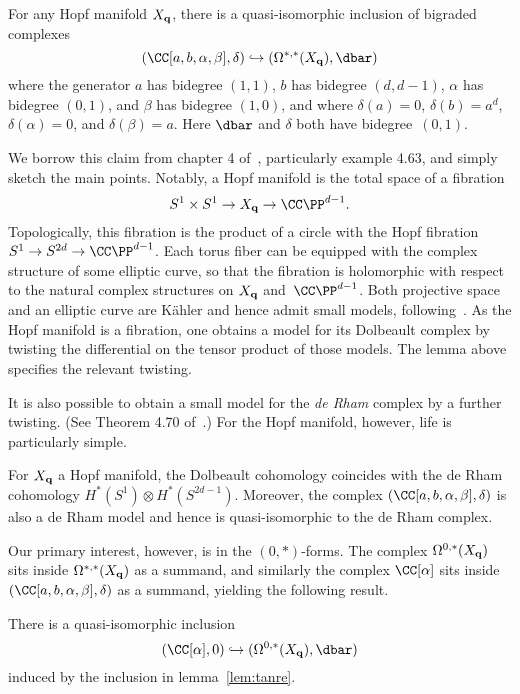 \begin{lem}\label{lem:tanre}
For any Hopf manifold $X_{\bf q}$, there is a quasi-isomorphic inclusion of bigraded complexes
\[
(\CC[a, b, \alpha, \beta], \delta) \hookrightarrow (\Omega^{*,*}(X_{\bf q}),\dbar)
\]
where the generator $a$ has bidegree $(1,1)$, $b$ has bidegree $(d,d-1)$, $\alpha$ has bidegree $(0,1)$, and $\beta$ has bidegree $(1,0)$, and where $\delta(a) = 0$, $\delta(b) = a^{d}$, $\delta(\alpha) = 0$, and $\delta(\beta) = a$.
Here $\dbar$ and $\delta$ both have bidegree~$(0,1)$.
\end{lem}

We borrow this claim from chapter 4 of~\cite{Tanre}, particularly example 4.63,
and simply sketch the main points.
Notably, a Hopf manifold is the total space of a fibration
\[
S^1 \times S^1 \to X_{\bf q} \to \CC\PP^{d-1}.
\]
Topologically, this fibration is the product of a circle with the Hopf fibration $S^1 \to S^{2d} \to \CC\PP^{d-1}$. 
Each torus fiber can be equipped with the complex structure of some elliptic curve, so that the fibration is holomorphic with respect to the natural complex structures on $X_{\bf q}$ and~$\CC\PP^{d-1}$.
Both projective space and an elliptic curve are K\"ahler and hence admit small models, 
following~\cite{DGMS}.
As the Hopf manifold is a fibration, one obtains a model for its Dolbeault complex by twisting the differential on the tensor product of those models.
The lemma above specifies the relevant twisting.

It is also possible to obtain a small model for the {\em de Rham} complex by a further twisting. 
(See Theorem 4.70 of~\cite{Tanre}.)
For the Hopf manifold, however, life is particularly simple.

\begin{lem}
For $X_{\bf q}$ a Hopf manifold,
the Dolbeault cohomology coincides with the de Rham cohomology $H^*(S^1) \otimes H^*(S^{2d-1})$.
Moreover, the complex $(\CC[a, b, \alpha, \beta], \delta)$ is also a de Rham model and hence is quasi-isomorphic to the de Rham complex.
\end{lem}

Our primary interest, however, is in the $(0,*)$-forms.
The complex $\Omega^{0, *}(X_{\bf q})$ sits inside $\Omega^{*, *}(X_{\bf q})$ as a summand,
and similarly the complex $\CC[\alpha]$ sits inside $(\CC[a, b, \alpha, \beta], \delta)$ as a summand,
yielding the following result.

\begin{lem}
There is a quasi-isomorphic inclusion 
\[
(\CC[\alpha], 0) \hookrightarrow (\Omega^{0,*}(X_{\bf q}), \dbar)
\]
induced by the inclusion in lemma~\ref{lem:tanre}.
\end{lem}

